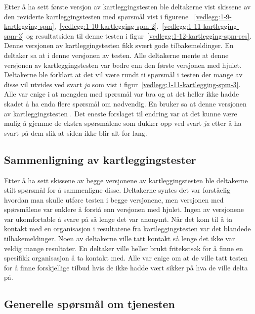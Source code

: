 Etter å ha sett første versjon av kartleggingstesten ble deltakerne vist skissene av den reviderte kartleggingstesten med spørsmål vist i figurene ~\ref{vedlegg:1-9-kartlegging-spm},~\ref{vedlegg:1-10-kartlegging-spm-2},~\ref{vedlegg:1-11-kartlegging-spm-3} og resultatsiden til denne testen i figur~\ref{vedlegg:1-12-kartlegging-spm-res}. Denne versjonen av kartleggingstesten fikk svært gode tilbakemeldinger. En deltaker sa at  i denne versjonen av testen. Alle deltakerne mente at denne versjonen av kartleggingstesten var bedre enn den første versjonen med hjulet. Deltakerne ble forklart at det vil være rundt ti spørsmål i testen der mange av disse vil utvides ved svart {\em ja} som vist i figur~\ref{vedlegg:1-11-kartlegging-spm-3}. Alle var enige i at mengden med spørsmål var bra og at det heller ikke hadde skadet å ha enda flere spørsmål om nødvendig. En bruker sa at denne versjonen av kartleggingstesten . Det eneste forslaget til endring var at det kunne være mulig å gjemme de ekstra spørsmålene som dukker opp ved svart {\em ja} etter å ha svart på dem slik at siden ikke blir alt for lang.


\subsection{Sammenligning av kartleggingstester}

Etter å ha sett skissene av begge versjonene av kartleggingstesten ble deltakerne stilt spørsmål for å sammenligne disse. Deltakerne syntes det var forståelig hvordan man skulle utføre testen i begge versjonene, men versjonen med spørsmålene var enklere å forstå enn versjonen med hjulet. Ingen av versjonene var ukomfortable å svare på så lenge det var anonymt. Når det kom til å ta kontakt med en organisasjon i resultatene fra kartleggingstesten var det blandede tilbakemeldinger. Noen av deltakerne ville tatt kontakt så lenge det ikke var veldig mange resultater. En deltaker ville heller brukt fritekstsøk for å finne en spesifikk organisasjon å ta kontakt med. Alle var enige om at de ville tatt testen for å finne forskjellige tilbud hvis de ikke hadde vært sikker på hva de ville delta på.

\subsection{Generelle spørsmål om tjenesten}

